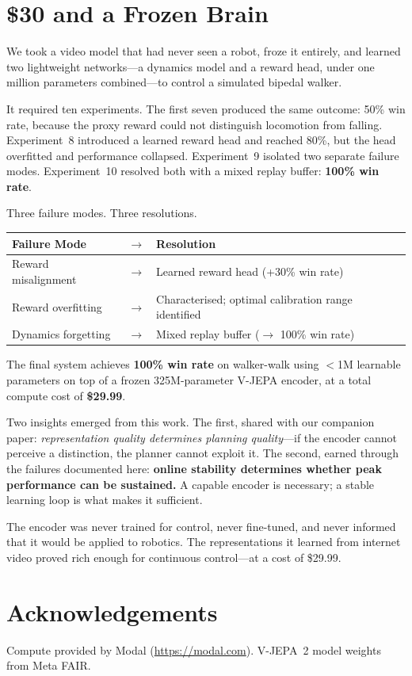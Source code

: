 \documentclass{article}
\begin{document}
\section{\$30 and a Frozen Brain}

We took a video model that had never seen a robot, froze it entirely, and learned two lightweight networks---a dynamics model and a reward head, under one million parameters combined---to control a simulated bipedal walker.

It required ten experiments. The first seven produced the same outcome: 50\% win rate, because the proxy reward could not distinguish locomotion from falling. Experiment~8 introduced a learned reward head and reached 80\%, but the head overfitted and performance collapsed. Experiment~9 isolated two separate failure modes. Experiment~10 resolved both with a mixed replay buffer: \textbf{100\% win rate}.

Three failure modes. Three resolutions.

\begin{center}
\begin{tabular}{lcl}
\textbf{Failure Mode} & $\rightarrow$ & \textbf{Resolution} \\
\midrule
Reward misalignment & $\rightarrow$ & Learned reward head (+30\% win rate) \\
Reward overfitting & $\rightarrow$ & Characterised; optimal calibration range identified \\
Dynamics forgetting & $\rightarrow$ & Mixed replay buffer ($\rightarrow$ 100\% win rate) \\
\end{tabular}
\end{center}

\noindent The final system achieves \textbf{100\% win rate} on walker-walk using $<$1M learnable parameters on top of a frozen 325M-parameter V-JEPA encoder, at a total compute cost of \textbf{\$29.99}.

Two insights emerged from this work. The first, shared with our companion paper: \emph{representation quality determines planning quality}---if the encoder cannot perceive a distinction, the planner cannot exploit it. The second, earned through the failures documented here: \textbf{online stability determines whether peak performance can be sustained.} A capable encoder is necessary; a stable learning loop is what makes it sufficient.

The encoder was never trained for control, never fine-tuned, and never informed that it would be applied to robotics. The representations it learned from internet video proved rich enough for continuous control---at a cost of \$29.99.

\section*{Acknowledgements}

Compute provided by Modal (\url{https://modal.com}). V-JEPA~2 model weights from Meta FAIR.



\end{document}
